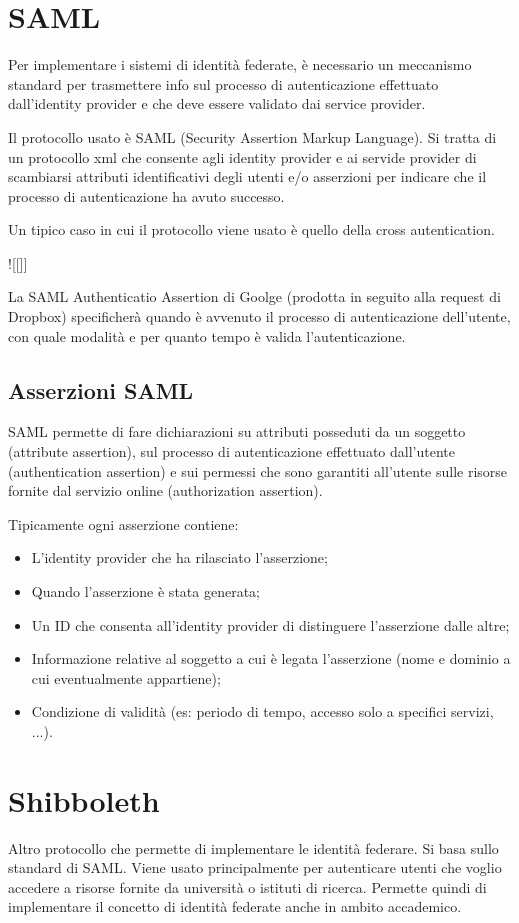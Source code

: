 \section{SAML}
Per implementare i sistemi di identità federate, è necessario un meccanismo standard per trasmettere info sul processo di autenticazione effettuato dall'identity provider e che deve essere validato dai service provider.

Il protocollo usato è SAML (Security Assertion Markup Language). Si tratta di un protocollo xml che consente agli identity provider e ai servide provider di scambiarsi attributi identificativi degli utenti e/o asserzioni per indicare che il processo di autenticazione ha avuto successo. 

Un tipico caso in cui il protocollo viene usato è quello della cross autentication.

![[]]

La SAML Authenticatio Assertion di Goolge (prodotta in seguito alla request di Dropbox) specificherà quando è avvenuto il processo di autenticazione dell'utente, con quale modalità e per quanto tempo è valida l'autenticazione. 

\subsection{Asserzioni SAML}

SAML permette di fare dichiarazioni su attributi posseduti da un soggetto (attribute assertion), sul processo di autenticazione effettuato dall'utente (authentication assertion) e sui permessi che sono garantiti all'utente sulle risorse fornite dal servizio online (authorization assertion). 

\noindent Tipicamente ogni asserzione contiene:
\begin{itemize}
    \item L'identity provider che ha rilasciato l'asserzione;
    \item Quando l'asserzione è stata generata;
    \item Un ID che consenta all'identity provider di distinguere l'asserzione dalle altre;
    \item Informazione relative al soggetto a cui è legata l'asserzione (nome e dominio a cui eventualmente appartiene);
    \item Condizione di validità (es: periodo di tempo, accesso solo a specifici servizi, ...).
\end{itemize}

\section{Shibboleth}
Altro protocollo che permette di implementare le identità federare. Si basa sullo standard di SAML. 
Viene usato principalmente per autenticare utenti che voglio accedere a risorse fornite da università o istituti di ricerca. Permette quindi di implementare il concetto di identità federate anche in ambito accademico. 

